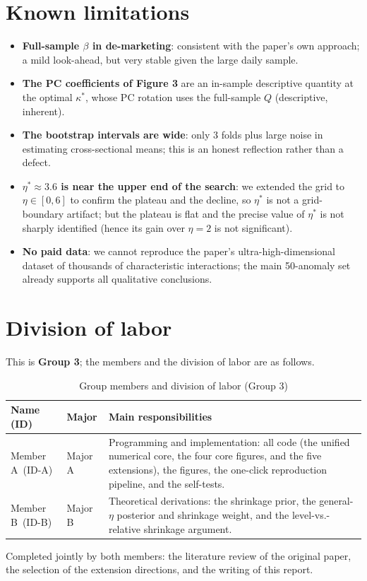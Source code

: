 \documentclass[11pt,a4paper]{article}
\newcommand{\memberA}{Member A}\newcommand{\sidA}{ID-A}\newcommand{\majorA}{Major A}
\newcommand{\memberB}{Member B}\newcommand{\sidB}{ID-B}\newcommand{\majorB}{Major B}
\begin{document}
\section{Known limitations}
\begin{itemize}
  \item \textbf{Full-sample $\beta$ in de-marketing}: consistent with the paper's own approach; a mild look-ahead,
  but very stable given the large daily sample.
  \item \textbf{The PC coefficients of Figure 3} are an in-sample descriptive quantity at the optimal $\kappa^*$,
  whose PC rotation uses the full-sample $Q$ (descriptive, inherent).
  \item \textbf{The bootstrap intervals are wide}: only 3 folds plus large noise in estimating cross-sectional
  means; this is an honest reflection rather than a defect.
  \item \textbf{$\eta^*\approx3.6$ is near the upper end of the search}: we extended the grid to $\eta\in[0,6]$ to
  confirm the plateau and the decline, so $\eta^*$ is not a grid-boundary artifact; but the plateau is flat and the
  precise value of $\eta^*$ is not sharply identified (hence its gain over $\eta{=}2$ is not significant).
  \item \textbf{No paid data}: we cannot reproduce the paper's ultra-high-dimensional dataset of thousands of
  characteristic interactions; the main 50-anomaly set already supports all qualitative conclusions.
\end{itemize}

\section{Division of labor}
This is \textbf{Group 3}; the members and the division of labor are as follows.

\begin{table}[H]\centering\small
\caption{Group members and division of labor (Group 3)}
\begin{tabular}{>{\raggedright\arraybackslash}p{3.7cm} >{\raggedright\arraybackslash}p{3.5cm} p{7.0cm}}
\toprule
Name (ID) & Major & Main responsibilities \\
\midrule
\memberA~(\sidA) & \majorA & Programming and implementation: all code (the unified numerical core, the four core
figures, and the five extensions), the figures, the one-click reproduction pipeline, and the self-tests. \\
\addlinespace
\memberB~(\sidB) & \majorB & Theoretical derivations: the shrinkage prior, the general-$\eta$ posterior and
shrinkage weight, and the level-vs.-relative shrinkage argument. \\
\bottomrule
\end{tabular}
\end{table}
\noindent Completed jointly by both members: the literature review of the original paper, the selection of the
extension directions, and the writing of this report.
\end{document}
